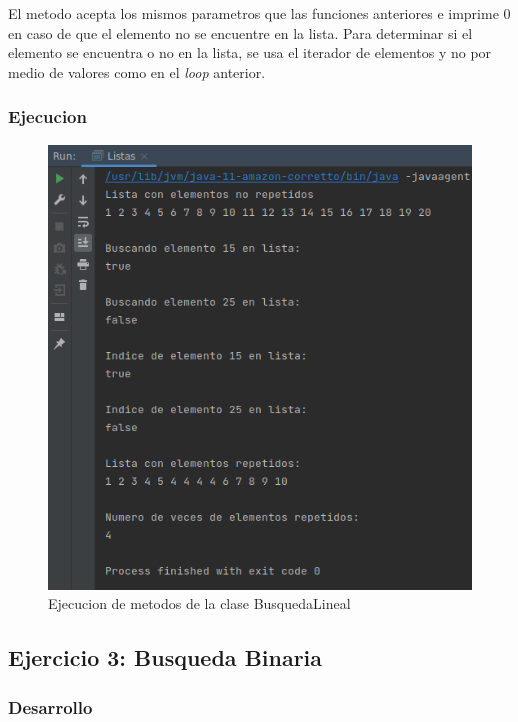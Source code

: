 \documentclass{article}
\begin{document}
\begin{enumerate}
					El metodo acepta los mismos parametros que las funciones anteriores e imprime 0 en caso de que el elemento no se encuentre en la lista. Para determinar si el elemento se encuentra o no en la lista, se usa el iterador de elementos y no por medio de valores como en el \emph{loop} anterior.
					 
				\end{enumerate}	
				
			\subsubsection{Ejecucion}
			
				\begin{figure}[H]
					\centering
					\includegraphics[scale = 0.7]{images/e2.png}
					\caption{Ejecucion de metodos de la clase BusquedaLineal}
				\end{figure}
			
			\newpage
			
		\subsection{Ejercicio 3: Busqueda Binaria}
		
			\subsubsection{Desarrollo}
				
\end{document}
